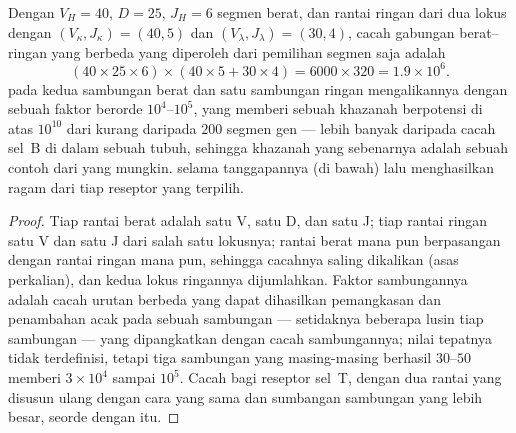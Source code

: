 \begin{theorem}\label{thm:b3:adaptive-immunity:repertoire}
Dengan $V_{H} = 40$, $D = 25$, $J_{H} = 6$ segmen berat, dan rantai ringan
dari dua lokus dengan $(V_{\kappa}, J_{\kappa}) = (40, 5)$ dan
$(V_{\lambda}, J_{\lambda}) = (30, 4)$, cacah gabungan
berat--ringan yang berbeda yang diperoleh dari pemilihan segmen saja adalah
\[
(40\times 25\times 6)\times(40\times 5 + 30\times 4) = 6000\times 320
= 1.9\times 10^{6}.
\]
 pada kedua sambungan berat dan satu sambungan ringan
mengalikannya dengan sebuah faktor berorde $10^{4}$--$10^{5}$, yang memberi
sebuah khazanah berpotensi di atas $10^{10}$ dari kurang daripada $200$ segmen
gen --- lebih banyak daripada cacah sel~B di dalam sebuah tubuh, sehingga
khazanah yang sebenarnya adalah sebuah contoh dari yang mungkin.  selama tanggapannya (di bawah) lalu menghasilkan ragam dari
tiap reseptor yang terpilih.
\end{theorem}
\begin{proof}
Tiap rantai berat adalah satu V, satu D, dan satu J; tiap rantai ringan satu V
dan satu J dari salah satu lokusnya; rantai berat mana pun berpasangan dengan
rantai ringan mana pun, sehingga cacahnya saling dikalikan (asas perkalian), dan
kedua lokus ringannya dijumlahkan. Faktor sambungannya adalah cacah urutan
berbeda yang dapat dihasilkan pemangkasan dan penambahan acak pada sebuah
sambungan --- setidaknya beberapa lusin tiap sambungan --- yang dipangkatkan
dengan cacah sambungannya; nilai tepatnya tidak terdefinisi, tetapi tiga
sambungan yang masing-masing berhasil $30$--$50$ memberi
$3\times 10^{4}$ sampai $10^{5}$. Cacah bagi reseptor sel~T, dengan dua
rantai yang disusun ulang dengan cara yang sama dan sumbangan sambungan yang
lebih besar, seorde dengan itu.
\end{proof}


